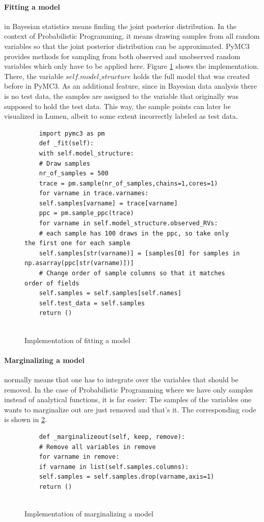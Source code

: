 \documentclass{article}
\begin{document}
\paragraph{Fitting a model} in Bayesian statistics means finding the joint posterior distribution. In the context of Probabilistic Programming, it means drawing samples from all random variables so that the joint posterior distribution can be approximated. PyMC3 provides methods for sampling from both observed and unobserved random variables which only have to be applied here. Figure \ref{fig:code_fitting_a_model} shows the implementation. There, the variable $self.model\_structure$ holds the full model that was created before in PyMC3. As an additional feature, since in Bayesian data analysis there is no test data, the samples are assigned to the variable that originally was supposed to hold the test data. This way, the sample points can later be visualized in Lumen, albeit to some extent incorrectly labeled as test data.
\begin{figure}[h]
	\begin{lstlisting}
	import pymc3 as pm
	def _fit(self):
	with self.model_structure:
	# Draw samples
	nr_of_samples = 500
	trace = pm.sample(nr_of_samples,chains=1,cores=1)
	for varname in trace.varnames:
	self.samples[varname] = trace[varname]
	ppc = pm.sample_ppc(trace)
	for varname in self.model_structure.observed_RVs:
	# each sample has 100 draws in the ppc, so take only the first one for each sample
	self.samples[str(varname)] = [samples[0] for samples in np.asarray(ppc[str(varname)])]			
	# Change order of sample columns so that it matches order of fields
	self.samples = self.samples[self.names]
	self.test_data = self.samples
	return ()
	
	\end{lstlisting}
	\caption[Implementation of fitting a model]{Implementation of fitting a model}
	\label{fig:code_fitting_a_model}
\end{figure}

\paragraph{Marginalizing a model} normally means that one has to integrate over the variables that should be removed. In the case of Probabilistic Programming where we have only samples instead of analytical functions, it is far easier: The samples of the variables one wants to marginalize out are just removed and that's it. The corresponding code is shown in \ref{fig:code_marginalizing_a_model}.
\begin{figure}[h]
	\begin{lstlisting}
	def _marginalizeout(self, keep, remove):
	# Remove all variables in remove
	for varname in remove:
	if varname in list(self.samples.columns):
	self.samples = self.samples.drop(varname,axis=1)
	return ()
	
	\end{lstlisting}
	\caption[Implementation of marginalizing a model]{Implementation of marginalizing a model}
	\label{fig:code_marginalizing_a_model}
\end{figure}
\end{document}
